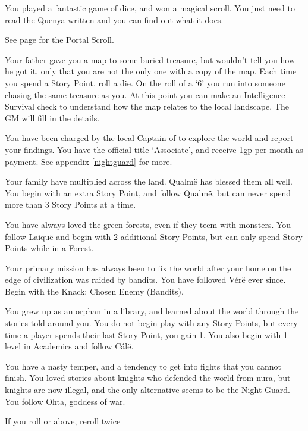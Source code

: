 \begin{multicols}{2}
\begin{list}{\addtocounter{list}{1}\textbf{:}}{\raggedleft}
\item{You played a fantastic game of dice, and won a magical scroll.
You just need to read the Quenya written and you can find out what it does.

See page \pageref{portalscroll} for the Portal Scroll.

}

\item{Your father gave you a map to some buried treasure, but wouldn't tell you how he got it, only that you are not the only one with a copy of the map.
Each time you spend a Story Point, roll a die.
On the roll of a `6' you run into someone chasing the same treasure as you.
At this point you can make an Intelligence + Survival check to understand how the map relates to the local landscape.
The GM will fill in the details.}

\item{You have been charged by the local Captain of  to explore the world and report your findings. You have the official title `Associate', and receive 1gp per month as payment. See appendix \ref{nightguard} for more.}

\item
Your family have multiplied across the land.
Qualm\"e has blessed them all well.
You begin with an extra Story Point, and follow Qualm\"e, but can never spend more than 3 Story Points at a time.

\item
You have always loved the green forests, even if they teem with monsters.
You follow Laiqu\"e and begin with 2 additional Story Points, but can only spend Story Points while in a Forest.

\item
Your primary mission has always been to fix the world after your home on the edge of civilization was raided by bandits.
You have followed V\'er\"e ever since.
Begin with the Knack: Chosen Enemy (Bandits).

\item
You grew up as an orphan in a library, and learned about the world through the stories told around you.
You do not begin play with any Story Points, but every time a player spends their  last Story Point, you gain 1.
You also begin with 1 level in Academics and follow C\'al\"e.

\item
You have a nasty temper, and a tendency to get into fights that you cannot finish.
You loved stories about knights who defended the world from nura, but knights are now illegal, and the only alternative seems to be the Night Guard.
You follow Ohta, goddess of war.

\item{If you roll  or above, reroll twice}

\end{list}

\end{multicols}

